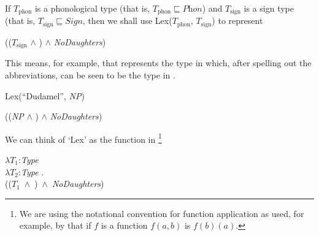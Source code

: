 If $T_{\mathrm{phon}}$ is a phonological type (that is,
$T_{\mathrm{phon}}\sqsubseteq\textit{Phon}$) and $T_{\mathrm{sign}}$
is a sign type (that is, $T_{\mathrm{sign}}\sqsubseteq\textit{Sign}$, then we shall use
Lex($T_{\mathrm{phon}}$, $T_{\mathrm{sign}}$) to represent \nexteg{}
\begin{ex} 
(($T_{\mathrm{sign}}$ \d{$\wedge$}
)
      \d{$\wedge$} \textit{NoDaughters}) 
\end{ex} 
This means, for
example, that  represents the type in 
which, after spelling out the abbreviations, can be seen to be the
type in .
\begin{ex} 
\begin{subex}

\item  Lex(``Dudamel'', \textit{NP})
 
\item ((\textit{NP} \d{$\wedge$}
)
      \d{$\wedge$} \textit{NoDaughters}) 
 
\item {} 
 
\end{subex} 
\label{ex:DudamelLex}   
\end{ex} 
We can think of `Lex' as the function in \nexteg{}\footnote{We are
  using the notational convention for function application as used,
  for example, by
  \cite{Montague1973} that if $f$ is a function $f(a,b)$ is $f(b)(a)$.}
\begin{ex} 
$\lambda T_1$:\textit{Type}\\
\hspace*{.25em}$\lambda T_2$:\textit{Type} . \\
\hspace*{.5em}\mbox{(($T_1$ \d{$\wedge$}
)
      \d{$\wedge$} \textit{NoDaughters})}
\end{ex} 
